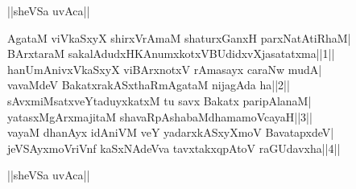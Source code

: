 \documentclass{article}
\begin{document}
\begin{center}
||sheVSa uvAca||
\end{center}

AgataM viVkaSxyX shirxVrAmaM shaturxGanxH parxNatAtiRhaM|\\
BArxtaraM sakalAdudxHKAnumxkotxVBUdidxvXjasatatxma||1||\\
hanUmAnivxVkaSxyX viBArxnotxV rAmasayx caraNw mudA|\\
vavaMdeV BakatxrakASxthaRmAgataM nijagAda ha||2||\\
sAvxmiMsatxveYtaduyxkatxM tu savx Bakatx paripAlanaM|\\
yatasxMgArxmajitaM shavaRpAshabaMdhamamoVcayaH||3||\\
vayaM dhanAyx idAniVM veY yadarxkASxyXmoV BavatapxdeV|\\
jeVSAyxmoVriVnf kaSxNAdeVva tavxtakxqpAtoV raGUdavxha||4||\\

\begin{center}
||sheVSa uvAca||
\end{center}
\end{document}
